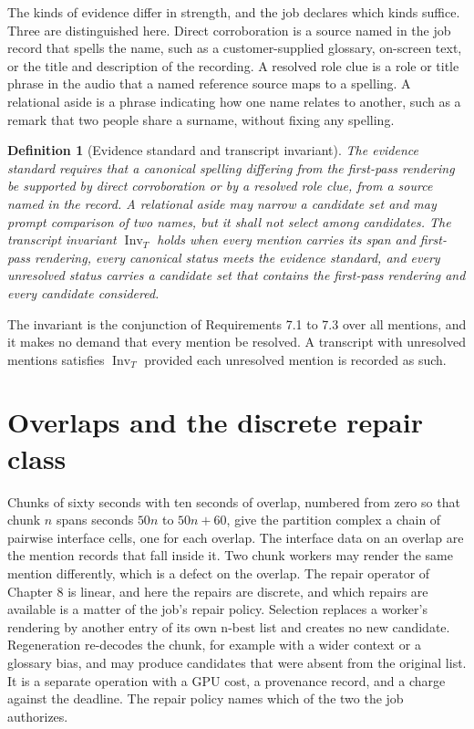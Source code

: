 \documentclass[11pt,openany]{book}
\newtheorem{definition}{Definition}[chapter]
\theoremstyle{remark}
\begin{document}
The kinds of evidence differ in strength, and the job declares which kinds suffice. Three are distinguished here. Direct corroboration is a source named in the job record that spells the name, such as a customer-supplied glossary, on-screen text, or the title and description of the recording. A resolved role clue is a role or title phrase in the audio that a named reference source maps to a spelling. A relational aside is a phrase indicating how one name relates to another, such as a remark that two people share a surname, without fixing any spelling.

\begin{definition}[Evidence standard and transcript invariant]
The evidence standard requires that a canonical spelling differing from the first-pass rendering be supported by direct corroboration or by a resolved role clue, from a source named in the record. A relational aside may narrow a candidate set and may prompt comparison of two names, but it shall not select among candidates. The transcript invariant $\operatorname{Inv}_T$ holds when every mention carries its span and first-pass rendering, every canonical status meets the evidence standard, and every unresolved status carries a candidate set that contains the first-pass rendering and every candidate considered.
\end{definition}

The invariant is the conjunction of Requirements 7.1 to 7.3 over all mentions, and it makes no demand that every mention be resolved. A transcript with unresolved mentions satisfies $\operatorname{Inv}_T$ provided each unresolved mention is recorded as such.

\section{Overlaps and the discrete repair class}

Chunks of sixty seconds with ten seconds of overlap, numbered from zero so that chunk $n$ spans seconds $50n$ to $50n+60$, give the partition complex a chain of pairwise interface cells, one for each overlap. The interface data on an overlap are the mention records that fall inside it. Two chunk workers may render the same mention differently, which is a defect on the overlap. The repair operator of Chapter 8 is linear, and here the repairs are discrete, and which repairs are available is a matter of the job's repair policy. Selection replaces a worker's rendering by another entry of its own n-best list and creates no new candidate. Regeneration re-decodes the chunk, for example with a wider context or a glossary bias, and may produce candidates that were absent from the original list. It is a separate operation with a GPU cost, a provenance record, and a charge against the deadline. The repair policy names which of the two the job authorizes.
\end{document}
